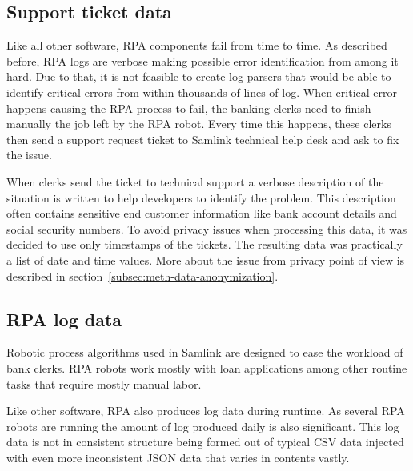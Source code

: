 \subsection{Support ticket data}\label{subsec:meth-efecte-ticket-data}

Like all other software,
RPA components fail from time to time.
As described before,
RPA logs are verbose
making possible error identification from among it hard.
Due to that,
it is not feasible to create log parsers
that would be able to identify critical errors
from within thousands of lines of log.
When critical error happens
causing the RPA process to fail,
the banking clerks need to finish manually
the job left by the RPA robot.
Every time this happens,
these clerks then send a support request ticket
to Samlink technical help desk
and ask to fix the issue.

When clerks send the ticket to technical support
a verbose description of the situation is written
to help developers to identify the problem.
This description often contains sensitive end customer information
like bank account details and social security numbers.
To avoid privacy issues when processing this data,
it was decided to use only timestamps of the tickets.
The resulting data was practically a list of date and time values.
More about the issue from privacy point of view
is described in section~\ref{subsec:meth-data-anonymization}.


\subsection{RPA log data}\label{subsec:meth-rpa-log-data}
Robotic process algorithms used in Samlink
are designed to ease the workload of bank clerks.
RPA robots work mostly with loan applications
among other routine tasks
that require mostly manual labor.

Like other software,
RPA also produces log data during runtime.
As several RPA robots are running
the amount of log produced daily is also significant.
This log data is not in consistent structure
being formed out of typical CSV data
injected with even more inconsistent JSON data
that varies in contents vastly.

